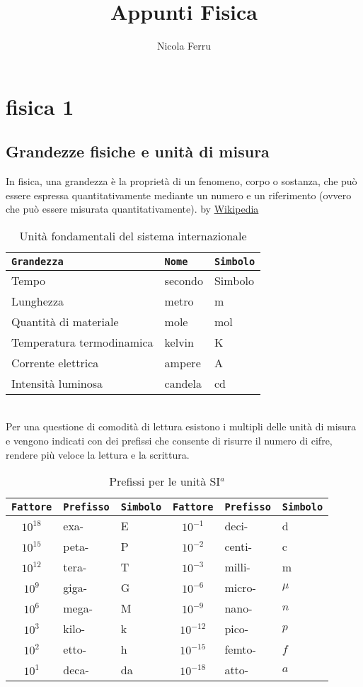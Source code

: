 \documentclass{book}
\title{Appunti Fisica}
\author{Nicola Ferru}
\date{}
\begin{document}
\maketitle
\tableofcontents
\listoftables
\listoffigures


\part{fisica 1}
\chapter{Grandezze fisiche e unità di misura}
In fisica, una grandezza è la proprietà di un fenomeno, corpo o sostanza, che può essere espressa quantitativamente mediante un numero e un riferimento (ovvero che può essere misurata quantitativamente). by \href{https://it.wikipedia.org/wiki/Grandezza_fisica}{Wikipedia}
\begin{table}[!h]
	\centering
	\begin{tabular}{lll}
		\texttt{Grandezza}&\texttt{Nome}&\texttt{Simbolo}\\\hline
		Tempo&secondo&Simbolo\\
		Lunghezza&metro&m\\
		Quantità di materiale&mole&mol\\
		Temperatura termodinamica&kelvin&K\\
		Corrente elettrica&ampere&A\\
		Intensità luminosa&candela&cd\\\hline
	\end{tabular}
\caption{Unità fondamentali del sistema internazionale}
\label{table:1}
\end{table}\\
Per una questione di comodità di lettura esistono i multipli delle unità di
misura e vengono indicati con dei prefissi che consente di risurre il numero di
cifre, rendere più veloce la lettura e la scrittura.
\begin{table}[!h]
	\centering
	\begin{tabular}{cll|cll}
		\texttt{Fattore}&\texttt{Prefisso}&\texttt{Simbolo}&\texttt{Fattore}&\texttt{Prefisso}&\texttt{Simbolo}\\\hline
		$10^{18}$&exa-&E&$10^{-1}$&deci-&d\\
		$10^{15}$&peta-&P&$10^{-2}$&centi-&c\\
		$10^{12}$&tera-&T&$10^{-3}$&milli-&m\\
		$10^{9}$&giga-&G&$10^{-6}$&micro-&$\mu$\\
		$10^{6}$&mega-&M&$10^{-9}$&nano-&$n$\\
		$10^{3}$&kilo-&k&$10^{-12}$&pico-&$p$\\
		$10^{2}$&etto-&h&$10^{-15}$&femto-&$f$\\
		$10^{1}$&deca-&da&$10^{-18}$&atto-&$a$\\\hline

	\end{tabular}
\caption{Prefissi per le unità SI$^a$}
\end{table}
\end{document}
